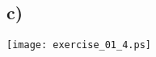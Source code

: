\documentclass[10pt,oneside,a4paper]{scrartcl}
\begin{document}
    \subsection*{c)}
    
    \begin{center}
        \texttt{[image: exercise\_01\_4.ps]}
    \end{center}
\end{document}
